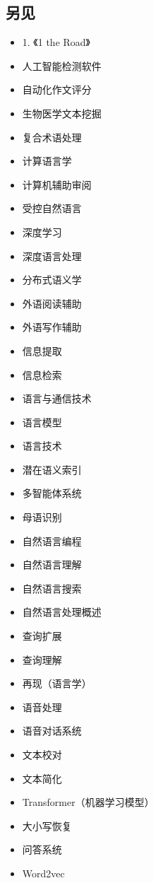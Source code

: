 \subsection{另见}  
\begin{itemize}
\item 1. 《1 the Road》  
\item 人工智能检测软件  
\item 自动化作文评分  
\item 生物医学文本挖掘  
\item 复合术语处理  
\item 计算语言学  
\item 计算机辅助审阅  
\item 受控自然语言  
\item 深度学习  
\item 深度语言处理  
\item 分布式语义学  
\item 外语阅读辅助  
\item 外语写作辅助  
\item 信息提取  
\item 信息检索  
\item 语言与通信技术  
\item 语言模型  
\item 语言技术  
\item 潜在语义索引  
\item 多智能体系统  
\item 母语识别  
\item 自然语言编程  
\item 自然语言理解  
\item 自然语言搜索  
\item 自然语言处理概述  
\item 查询扩展  
\item 查询理解  
\item 再现（语言学）  
\item 语音处理  
\item 语音对话系统  
\item 文本校对  
\item 文本简化  
\item Transformer（机器学习模型）  
\item 大小写恢复  
\item 问答系统  
\item Word2vec
\end{itemize}